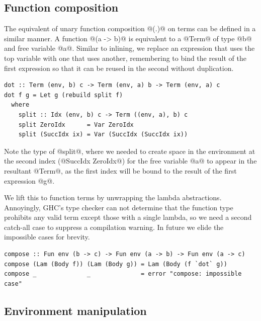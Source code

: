 
\subsection{Function composition}
\label{sec:function_composition}

The equivalent of unary function composition @(.)@ on terms can be
defined in a similar manner. A function @(a -> b)@ is equivalent to a
@Term@ of type @b@ and free variable @a@. Similar to inlining, we
replace an expression that uses the top variable with one that uses another,
remembering to bind the result of the first expression so that it can be reused
in the second without duplication.
%
\begin{lstlisting}[style=haskell
    ,name=function_composition
    ,caption={[A simultaneous substitution to compose unary function terms]}]
dot :: Term (env, b) c -> Term (env, a) b -> Term (env, a) c
dot f g = Let g (rebuild split f)
  where
    split :: Idx (env, b) c -> Term ((env, a), b) c
    split ZeroIdx      = Var ZeroIdx
    split (SuccIdx ix) = Var (SuccIdx (SuccIdx ix))
\end{lstlisting}
%
Note the type of @split@, where we needed to create space in the
environment at the second index (@SuccIdx ZeroIdx@) for the free variable
@a@ to appear in the resultant @Term@, as the first index will be
bound to the result of the first expression @g@.

We lift this to function terms by unwrapping the lambda abstractions.
Annoyingly, GHC's type checker can not determine that the function type
prohibits any valid term except those with a single lambda, so we need a second
catch-all case to suppress a compilation warning. In future we elide the
impossible cases for brevity.
%
\begin{lstlisting}[style=haskell,
    name=function_composition,
    caption={A simultaneous substitution to compose unary function terms}]
compose :: Fun env (b -> c) -> Fun env (a -> b) -> Fun env (a -> c)
compose (Lam (Body f)) (Lam (Body g)) = Lam (Body (f `dot` g))
compose _              _              = error "compose: impossible case"
\end{lstlisting}


\subsection{Environment manipulation}
\label{sec:environment_manipulation}

